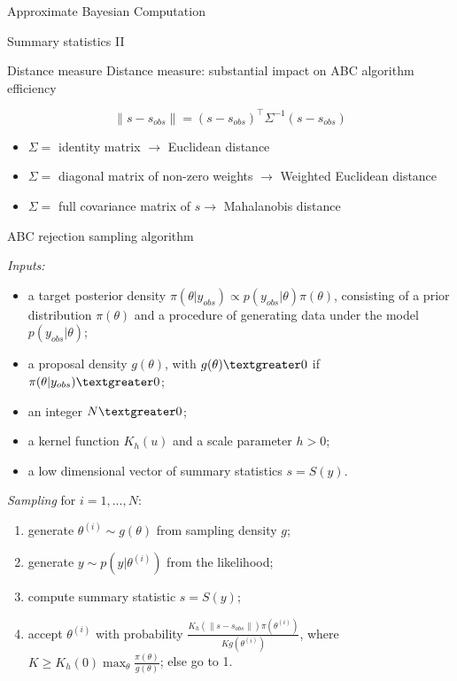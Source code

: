 \documentclass{beamer}
\begin{document}
\begin{section}{Approximate Bayesian Computation}
\begin{frame}{Summary statistics II}
	\end{frame}

	\begin{frame}{Distance measure}
		Distance measure: substantial impact on ABC algorithm efficiency
		
		\[  \parallel s - s_{obs} \parallel = (s - s_{obs})^\top \Sigma^{-1} (s - s_{obs}) \]
		
		\pause
		\vspace{1cm}
		\begin{itemize}
			\item $\Sigma = $ identity matrix $ \rightarrow$ Euclidean distance 
			\item $\Sigma =$ diagonal matrix of non-zero weights $ \rightarrow$ Weighted Euclidean distance 
			\item $\Sigma = $ full covariance matrix of $s \rightarrow$ Mahalanobis distance 
		\end{itemize}
	\end{frame}

	\begin{frame}{ABC rejection sampling algorithm}

		 {
			\emph{Inputs:}
			\begin{itemize}
				\item a target posterior density $\pi(\theta | y_{obs}) \propto p(y_{obs}|\theta) \pi(\theta)$, consisting of a prior distribution $\pi(\theta)$ and a procedure of generating data under the model $p(y_{obs}|\theta)$;
				\item a proposal density $g(\theta)$, with $g(\theta)\textgreater 0 $ if $\pi(\theta | y_{obs}) \textgreater 0$;
				\item an integer $N \textgreater0$;
				\item a kernel function $K_h(u)$ and a scale parameter $h > 0$;
				\item a low dimensional vector of summary statistics $s=S(y)$.
			\end{itemize}
		}
		\only<2> {
			\emph{Sampling} for $i= 1,..., N$:
			\begin{enumerate}
				\item generate $\theta ^ {(i)} \sim g(\theta)$ from sampling density $g$;
				\item generate $ y \sim p(y|\theta ^ {(i)})$ from the likelihood;
				\item compute summary statistic $s = S(y)$;
				\item accept $\theta ^ {(i)}$ with probability $\frac{K_h(\parallel s-s_{obs}\parallel)   \pi(\theta ^ {(i)})}{K g(\theta ^ {(i)})}$, where $K \geq K_h(0)\max_{\theta}{\frac{\pi(\theta)}{g(\theta)}}$; else go to 1.
			\end{enumerate}
		
}
\end{frame}
\end{section}
\end{document}

